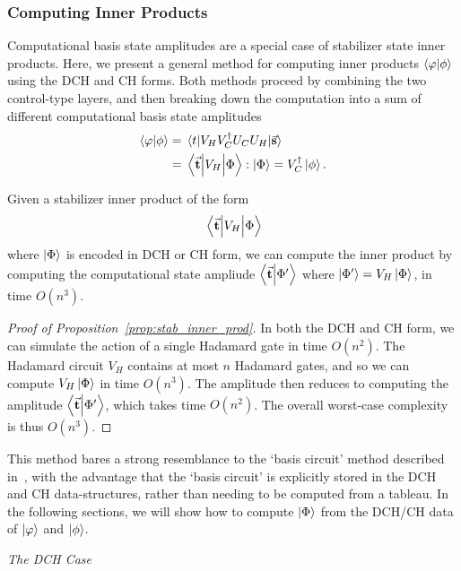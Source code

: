 \subsubsection*{Computing Inner Products}
Computational basis state amplitudes are a special case of stabilizer state inner products. Here, we present a general method for computing inner products $\braket{\varphi}{\phi}$ using the DCH and CH forms. Both methods proceed by combining the two control-type layers, and then breaking down the computation into a sum of different computational basis state amplitudes
\begin{align*}
\braket{\varphi}{\phi} &= \matrixel{t}{V_{H}V_{C}^{\dagger}U_{C}U_{H}}{\va{s}} \\
&= \matrixel{\va{t}}{V_{H}}{\Phi} : \ket{\Phi} = V_{C}^{\dagger} \ket{\phi}.
\end{align*}
\begin{prop}
Given a stabilizer inner product of the form
\[\matrixel{\va{t}}{V_{H}}{\Phi}\]
where $\ket{\Phi}$ is encoded in DCH or CH form, we can compute the inner product by computing the computational state ampliude $\braket{\va{t}}{\Phi'}$ where $\ket{\Phi'}=V_{H}\ket{\Phi}$, in time $O(n^{3})$.\label{prop:stab_inner_prod}
\end{prop}
\begin{proof}[Proof of Proposition~\ref{prop:stab_inner_prod}]
In both the DCH and CH form, we can simulate the action of a single Hadamard gate in time $O(n^{2})$. The Hadamard circuit $V_{H}$ contains at most $n$ Hadamard gates, and so we can compute $V_{H}\ket{\Phi}$ in time $O(n^{3})$. The amplitude then reduces to computing the amplitude $\braket{\va{t}}{\Phi'}$, which takes time $O(n^{2})$. The overall worst-case complexity is thus $O(n^{3})$.
\end{proof}
This method bares a strong resemblance to the `basis circuit' method described in~\cite{Garcia2012}, with the advantage that the `basis circuit' is explicitly stored in the DCH and CH data-structures, rather than needing to be computed from a  tableau. In the following sections, we will show how to compute $\ket{\Phi}$ from the DCH/CH data of $\ket{\varphi}$ and $\ket{\phi}$.\par
\large{\itshape{The DCH Case}}\\
